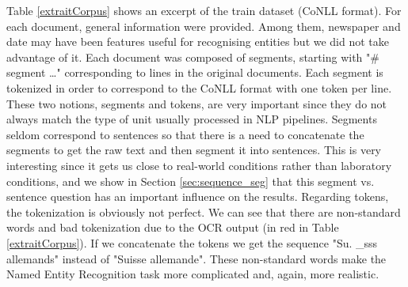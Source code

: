Table \ref{extraitCorpus} shows an excerpt of the train dataset (CoNLL format).
For each document, general information were provided. Among them, newspaper and date may have been features useful for recognising entities but we did not take advantage of it.
Each document was composed of segments, starting with "\# segment \dots" corresponding to lines in the original documents. Each segment is tokenized in order to correspond to the CoNLL format with one token per line.
These two notions, segments and tokens, are very important since they do not always match the type of unit usually processed in NLP pipelines.
Segments seldom correspond to sentences so that there is a need to concatenate the segments to get the raw text and then segment it into sentences. This is very interesting since it gets us close to real-world conditions rather than laboratory conditions, and we show in Section \ref{sec:sequence_seg} that this segment vs. sentence question has an important influence on the results.
Regarding tokens, the tokenization is obviously not perfect.
We can see that there are non-standard words and bad tokenization due to the OCR output (in red in Table \ref{extraitCorpus}).
If we concatenate the tokens we get the sequence "Su. \_sss allemands" instead of "Suisse allemande". These non-standard words make the Named Entity Recognition task more complicated and, again, more realistic.


